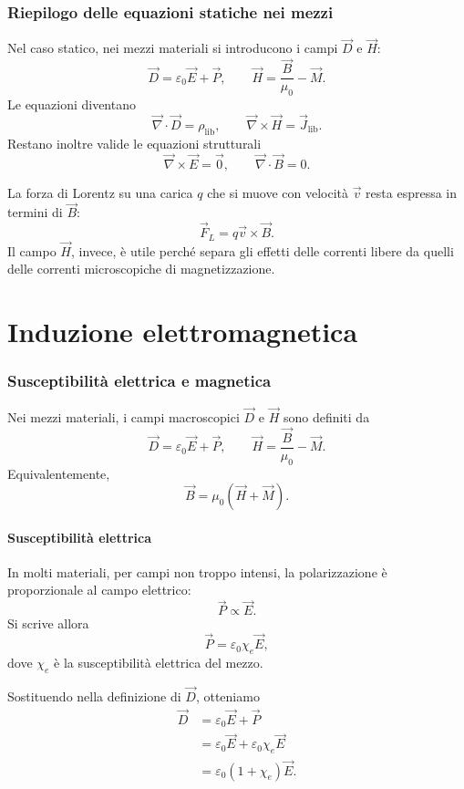 \documentclass[a4paper]{article}
\begin{document}
\section{Riepilogo delle equazioni statiche nei mezzi}

Nel caso statico, nei mezzi materiali si introducono i campi \(\vec{D}\) e \(\vec{H}\):
\[
\vec{D}=\varepsilon_0\vec{E}+\vec{P},
\qquad
\vec{H}=\frac{\vec{B}}{\mu_0}-\vec{M}.
\]
Le equazioni diventano
\[
\vec{\nabla}\cdot\vec{D}=\rho_{\mathrm{lib}},
\qquad
\vec{\nabla}\times\vec{H}=\vec{J}_{\mathrm{lib}}.
\]
Restano inoltre valide le equazioni strutturali
\[
\vec{\nabla}\times\vec{E}=\vec{0},
\qquad
\vec{\nabla}\cdot\vec{B}=0.
\]

La forza di Lorentz su una carica \(q\) che si muove con velocità \(\vec{v}\) resta espressa in termini di \(\vec{B}\):
\[
\vec{F}_L=q\vec{v}\times\vec{B}.
\]
Il campo \(\vec{H}\), invece, è utile perché separa gli effetti delle correnti libere da quelli delle correnti microscopiche di magnetizzazione.

\pagebreak
\part{Induzione elettromagnetica}

\section{Susceptibilità elettrica e magnetica}

Nei mezzi materiali, i campi macroscopici \(\vec{D}\) e \(\vec{H}\) sono definiti da
\[
\vec{D}=\varepsilon_0\vec{E}+\vec{P},
\qquad
\vec{H}=\frac{\vec{B}}{\mu_0}-\vec{M}.
\]
Equivalentemente,
\[
\vec{B}=\mu_0\left(\vec{H}+\vec{M}\right).
\]

\subsection{Susceptibilità elettrica}

In molti materiali, per campi non troppo intensi, la polarizzazione è proporzionale al campo elettrico:
\[
\vec{P}\propto\vec{E}.
\]
Si scrive allora
\[
\vec{P}=\varepsilon_0\chi_e\vec{E},
\]
dove \(\chi_e\) è la susceptibilità elettrica del mezzo.

Sostituendo nella definizione di \(\vec{D}\), otteniamo
\begin{align*}
\vec{D}
&=\varepsilon_0\vec{E}+\vec{P} \\
&=\varepsilon_0\vec{E}+\varepsilon_0\chi_e\vec{E} \\
&=\varepsilon_0(1+\chi_e)\vec{E}.
\end{align*}
\end{document}
